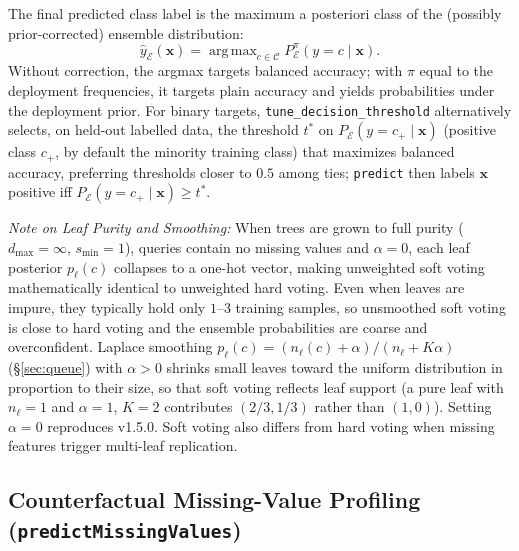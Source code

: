 \documentclass[11pt,a4paper]{article}
\newcommand{\code}[1]{\texttt{#1}}
\DeclareMathOperator*{\argmax}{arg\,max}
\begin{document}
The final predicted class label is the maximum a posteriori class of the (possibly prior-corrected) ensemble distribution:
\begin{equation}
  \hat{y}_{\mathcal{E}}(\mathbf{x}) = \argmax_{c \in \mathcal{C}} P^{\pi}_{\mathcal{E}}(y = c \mid \mathbf{x}).
\end{equation}
Without correction, the argmax targets balanced accuracy; with $\pi$ equal to the deployment frequencies, it targets plain accuracy and yields probabilities under the deployment prior. For binary targets, \code{tune\_decision\_threshold} alternatively selects, on held-out labelled data, the threshold $t^{\ast}$ on $P_{\mathcal{E}}(y = c_{+} \mid \mathbf{x})$ (positive class $c_{+}$, by default the minority training class) that maximizes balanced accuracy, preferring thresholds closer to $0.5$ among ties; \code{predict} then labels $\mathbf{x}$ positive iff $P_{\mathcal{E}}(y = c_{+} \mid \mathbf{x}) \ge t^{\ast}$.

\noindent\emph{Note on Leaf Purity and Smoothing:} When trees are grown to full purity ($d_{\max} = \infty$, $s_{\min} = 1$), queries contain no missing values and $\alpha = 0$, each leaf posterior $p_{\ell}(c)$ collapses to a one-hot vector, making unweighted soft voting mathematically identical to unweighted hard voting. Even when leaves are impure, they typically hold only $1$--$3$ training samples, so unsmoothed soft voting is close to hard voting and the ensemble probabilities are coarse and overconfident. Laplace smoothing $p_{\ell}(c) = (n_{\ell}(c) + \alpha)/(n_{\ell} + K\alpha)$ (\S\ref{sec:queue}) with $\alpha > 0$ shrinks small leaves toward the uniform distribution in proportion to their size, so that soft voting reflects leaf support (a pure leaf with $n_{\ell} = 1$ and $\alpha = 1$, $K = 2$ contributes $(2/3, 1/3)$ rather than $(1, 0)$). Setting $\alpha = 0$ reproduces v1.5.0. Soft voting also differs from hard voting when missing features trigger multi-leaf replication.

\subsection{Counterfactual Missing-Value Profiling (\texorpdfstring{\code{predictMissingValues}}{predictMissingValues})}
\end{document}
